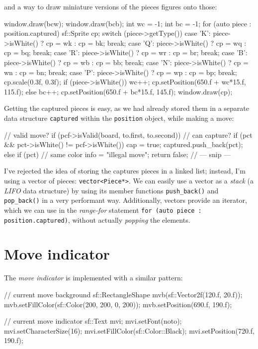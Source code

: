 and a way to draw miniature versions of the pieces figures onto those:

\begin{cpp}
window.draw(bcw);
window.draw(bcb);
int wc = -1;
int bc = -1;
for (auto piece : position.captured) {
  sf::Sprite cp;
  switch (piece->getType()) {
  case 'K':
    piece->isWhite() ? cp = wk : cp = bk;
    break;
  case 'Q':
    piece->isWhite() ? cp = wq : cp = bq;
    break;
  case 'R':
    piece->isWhite() ? cp = wr : cp = br;
    break;
  case 'B':
    piece->isWhite() ? cp = wb : cp = bb;
    break;
  case 'N':
    piece->isWhite() ? cp = wn : cp = bn;
    break;
  case 'P':
    piece->isWhite() ? cp = wp : cp = bp;
    break;
  }
  cp.scale(0.3f, 0.3f);
  if (piece->isWhite()) {
    wc++;
    cp.setPosition(650.f + wc*15.f, 115.f);
  } else {
    bc++;
    cp.setPosition(650.f + bc*15.f, 145.f);
  }
  window.draw(cp);
}
\end{cpp}

Getting the captured pieces is easy, as we had already stored them in a separate
data structure \texttt{captured} within the \texttt{position} object, while making a move:

\begin{cpp}
// valid move?
if (pcf->isValid(board, to.first, to.second)) {
  // can capture?
  if (pct && pct->isWhite() != pcf->isWhite()) {
    cap = true;
    captured.push_back(pct);
  } else if (pct) { // same color
    info = "illegal move";
    return false;
  }
  // --- snip ---
}
\end{cpp}

I've rejected the idea of storing the captures pieces in a linked list; instead, I'm using
a vector of pieces: \texttt{vector<Piece*>}.
We can easily use a vector as a \emph{stack} (a \emph{LIFO} data structure) by using its
member functions \texttt{push_back()} and \texttt{pop_back()}
in a very performant way.
Additionally, vectors provide an iterator, which we can use in the \emph{range-for} statement
\texttt{for (auto piece : position.captured)}, without actually \emph{popping} the
elements.

\section{Move indicator}

The \emph{move indicator} is implemented with a similar pattern:

\begin{cpp}
// current move background
sf::RectangleShape mvb(sf::Vector2f(120.f, 20.f));
mvb.setFillColor(sf::Color(200, 200, 0, 200));
mvb.setPosition(690.f, 190.f);

// current move indicator
sf::Text mvi;
mvi.setFont(noto);
mvi.setCharacterSize(16);
mvi.setFillColor(sf::Color::Black);
mvi.setPosition(720.f, 190.f);
\end{cpp}

